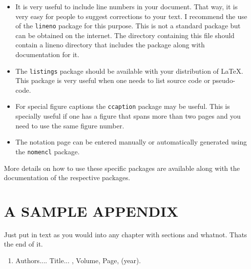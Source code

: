 \documentclass[Other]{iitddiss}
\begin{document}
\begin{itemize}
\item It is very useful to include line numbers in your document.
  That way, it is very easy for people to suggest corrections to your
  text.  I recommend the use of the \texttt{lineno} package for this
  purpose.  This is not a standard package but can be obtained on the
  internet.  The directory containing this file should contain a
  lineno directory that includes the package along with documentation
  for it.

\item The \texttt{listings} package should be available with your
  distribution of \LaTeX.  This package is very useful when one needs
  to list source code or pseudo-code.

\item For special figure captions the \texttt{ccaption} package may be
  useful.  This is specially useful if one has a figure that spans
  more than two pages and you need to use the same figure number.

\item The notation page can be entered manually or automatically
  generated using the \texttt{nomencl} package.

\end{itemize}

More details on how to use these specific packages are available along
with the documentation of the respective packages.


\appendix

\chapter{A SAMPLE APPENDIX}

Just put in text as you would into any chapter with sections and
whatnot.  Thats the end of it.


\begin{singlespace}
  
\end{singlespace}



\listofpapers

\begin{enumerate}
\item Authors....  \newblock
 Title...
  , Volume,
  Page, (year).
\end{enumerate}
\end{document}
